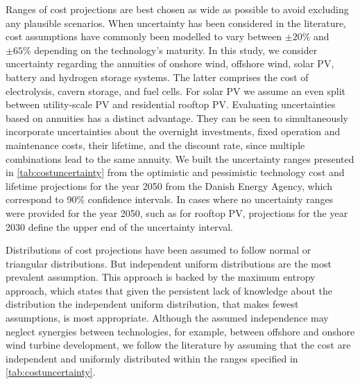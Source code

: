 
Ranges of cost projections are best chosen as wide as possible to avoid
excluding any plausible scenarios.
\cite{moret_characterization_2017,mccollum_energy_2020} When uncertainty has
been considered in the literature, cost assumptions have commonly been modelled
to vary between $\pm20\%$ and $\pm65\%$ depending on the technology's maturity.
\cite{moret_characterization_2017,shirizadeh_how_2019,pizarro-alonso_uncertainties_2019,li_using_2020,trondle_trade-offs_2020}
In this study, we consider uncertainty regarding the annuities of onshore wind,
offshore wind, solar PV, battery and hydrogen storage systems. The latter
comprises the cost of electrolysis, cavern storage, and fuel cells. For solar PV
we assume an even split between utility-scale PV and residential rooftop PV.
Evaluating uncertainties based on annuities has a distinct advantage. They can
be seen to simultaneously incorporate uncertainties about the overnight
investments, fixed operation and maintenance costs, their lifetime, and the
discount rate, since multiple combinations lead to the same annuity. We built
the uncertainty ranges presented in \cref{tab:costuncertainty} from the
optimistic and pessimistic technology cost and lifetime projections for the year
2050 from the Danish Energy Agency, which correspond to 90\% confidence
intervals.\cite{DEA} In cases where no uncertainty ranges were provided for the
year 2050, such as for rooftop PV, projections for the year 2030 define the
upper end of the uncertainty interval.


Distributions of cost projections have been assumed to follow
normal\cite{mavromatidis_uncertainty_2018} or triangular\cite{li_using_2020}
distributions. But independent uniform distributions are the most prevalent
assumption.\cite{moret_characterization_2017,moret_robust_2016,shirizadeh_how_2019,trondle_trade-offs_2020,pilpola_analyzing_2020,Li2017,Trutnevyte2013,lopion_cost_2019}
This approach is backed by the maximum entropy approach,
\cite{trondle_trade-offs_2020} which states that given the persistent lack of
knowledge about the distribution the independent uniform distribution, that
makes fewest assumptions, is most appropriate. Although the assumed independence
may neglect synergies between technologies, for example, between offshore and
onshore wind turbine development, we follow the literature by assuming that the
cost are independent and uniformly distributed within the ranges specified in
\cref{tab:costuncertainty}.

